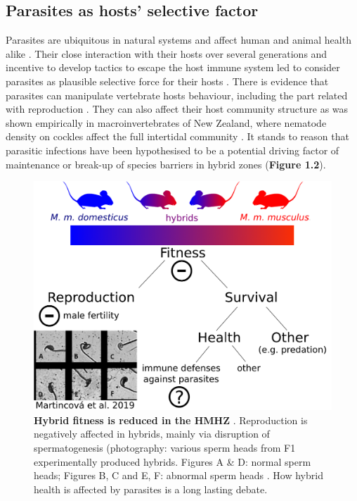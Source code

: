 \subsection{Parasites as hosts’ selective factor}
Parasites are ubiquitous in natural systems and affect human and animal health alike \citep{schurer_community-based_2016}. Their close interaction with their hosts over several generations and incentive to develop tactics to escape the host immune system led to consider parasites as plausible selective force for their hosts \citep{schmid-hempel_parasitesnew_2009}. There is evidence that parasites can manipulate vertebrate hosts behaviour, including the part related with reproduction \citep{klein_parasite_2003}. They can also affect their host community structure as was shown empirically in macroinvertebrates of New Zealand, where nematode density on cockles affect the full intertidal community \citep{mouritsen_parasites_2005}. It stands to reason that parasitic infections have been hypothesised to be a potential driving factor of maintenance or break-up of species barriers in hybrid zones \citep{sage_wormy_1986} (\textbf{Figure 1.2}).

\begin{figure}[H]
    \centering
     \includegraphics[width=.7\linewidth,height=\textheight,keepaspectratio]{images/1introduction/Figure2.pdf}
    \caption{\textbf{Hybrid fitness is reduced in the HMHZ} \citep{baird_what_2012}. Reproduction is negatively affected in hybrids, mainly via disruption of spermatogenesis (photography: various sperm heads from F1 experimentally produced hybrids. Figures A \& D: normal sperm heads; Figures B, C and E, F: abnormal sperm heads \parencite[source:][]{martincova_sperm_2019}. How hybrid health is affected by parasites is a long lasting debate.}
\end{figure}

